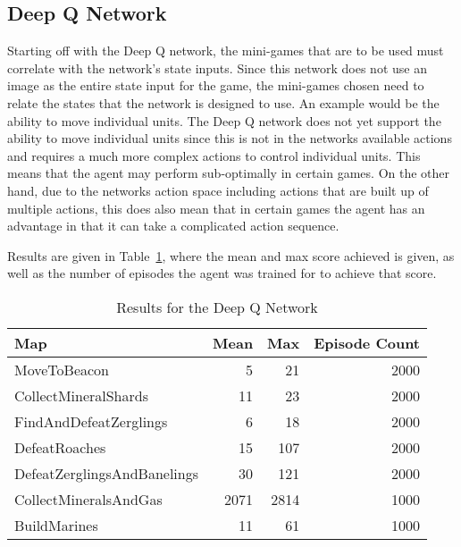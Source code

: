 \subsection{Deep Q Network}

Starting off with the Deep Q network, the mini-games that are to be used must
correlate with the network's state inputs. Since this network does not use an
image as the entire state input for the game, the mini-games chosen need to
relate the states that the network is designed to use. An example would be the
ability to move individual units. The Deep Q network does not yet support the
ability to move individual units since this is not in the networks available actions and
requires a much more complex actions to control individual units. This means
that the agent may perform sub-optimally in certain games.
On the other hand, due to the networks action space including actions that are
built up of multiple actions, this does also mean that in certain games the
agent has an advantage in that it can take a complicated action sequence.

Results are given in Table~\ref{tab:dqn_results}, where the mean and max score
achieved is given, as well as the number of episodes the agent was trained for
to achieve that score.

\begin{table}[h]
    \centering
    \begin{tabular}{@{}lrrr@{}}
        \toprule
        Map                         & Mean & Max & Episode Count \\ \midrule
        MoveToBeacon                & 5    & 21  & 2000          \\
        CollectMineralShards        & 11   & 23  & 2000          \\
        FindAndDefeatZerglings      & 6    & 18  & 2000              \\
        DefeatRoaches               & 15   & 107 & 2000              \\
        DefeatZerglingsAndBanelings & 30   & 121 & 2000              \\
        CollectMineralsAndGas       & 2071 & 2814& 1000          \\
        BuildMarines                & 11   & 61  & 1000          \\ \bottomrule
    \end{tabular}
    \caption{Results for the Deep Q Network}%
    \label{tab:dqn_results}%
\end{table}

